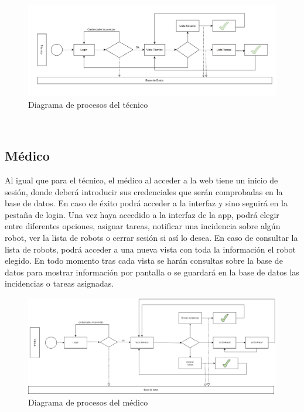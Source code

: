 \documentclass{scrreprt}
\begin{document}
\begin{figure}[H]
	\centering
	\includegraphics[width=1\textwidth ]{images/procesos_tecnico.jpeg}
	\caption{Diagrama de procesos del técnico}
	\label{fig:example1}
\end{figure}\\


\subsection{Médico}

Al igual que para el técnico, el médico al acceder a la web tiene un inicio de sesión, donde deberá introducir sus credenciales que serán comprobadas en la base de datos. En caso de éxito podrá acceder a la interfaz y sino seguirá en la pestaña de login. Una vez haya accedido a la interfaz de la app, podrá elegir entre diferentes opciones, asignar tareas, notificar una incidencia sobre algún robot, ver la lista de robots o cerrar sesión si así lo desea. En caso de consultar la lista de robots, podrá acceder a una nueva vista con toda la información el robot elegido. En todo momento tras cada vista se harán consultas sobre la base de datos para mostrar información por pantalla o se guardará en la base de datos las incidencias o tareas asignadas.

\begin{figure}[H]
	\centering
	\includegraphics[width=1\textwidth]{images/medico.drawio.png}
	\caption{Diagrama de procesos del médico}
	\label{fig:example1}
\end{figure}
\end{document}
